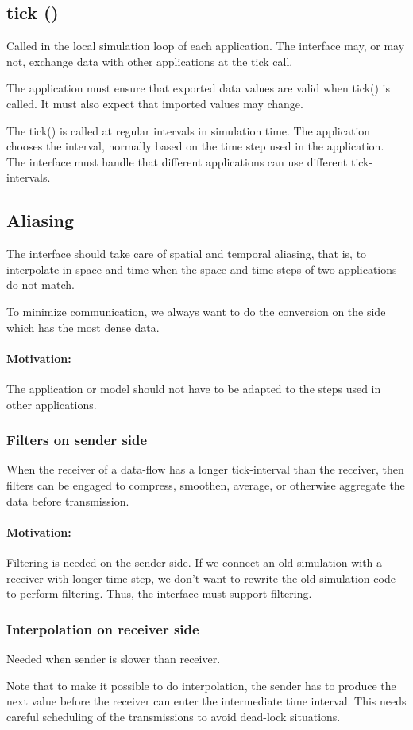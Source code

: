 \documentclass[a4paper]{report}
\begin{document}
\subsection{tick ()}

Called in the local simulation loop of each application.
The interface may, or may not, exchange data with other applications
at the tick call.

The application must ensure that exported data values are valid when
tick() is called.  It must also expect that imported values may change.

The tick() is called at regular intervals in simulation time.
The application chooses the interval, normally based on the time step
used in the application.  The interface must handle that different
applications can use different tick-intervals.


\subsection{Aliasing}

The interface should take care of spatial and temporal aliasing, that
is, to interpolate in space and time when the space and time steps of
two applications do not match.

To minimize communication, we always want to do the conversion on the
side which has the most dense data.

\paragraph{Motivation:} The application or model should not have to be
adapted to the steps used in other applications.


\subsubsection{Filters on sender side}

When the receiver of a data-flow has a longer tick-interval than the
receiver, then filters can be engaged to compress, smoothen, average,
or otherwise aggregate the data before transmission.

\paragraph{Motivation:} Filtering is needed on the sender side.  If we
connect an old simulation with a receiver with longer time step, we
don't want to rewrite the old simulation code to perform filtering.
Thus, the interface must support filtering.


\subsubsection{Interpolation on receiver side}

Needed when sender is slower than receiver.

Note that to make it possible to do interpolation, the sender has to
produce the next value before the receiver can enter the intermediate
time interval.  This needs careful scheduling of the transmissions to
avoid dead-lock situations.
\end{document}
